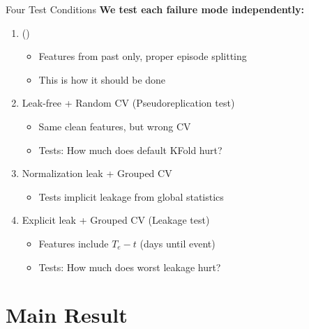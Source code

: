\documentclass[aspectratio=169]{beamer}
\begin{document}
\begin{frame}{Four Test Conditions}
\textbf{We test each failure mode independently:}

\vspace{1em}
\begin{enumerate}
\item {} \hfill ()
\begin{itemize}
\item Features from past only, proper episode splitting
\item This is how it \alert{should} be done
\end{itemize}

\vspace{0.3em}
\item \alert{Leak-free + Random CV} \hfill (\alert{Pseudoreplication test})
\begin{itemize}
\item Same clean features, but wrong CV
\item Tests: How much does default KFold hurt?
\end{itemize}

\vspace{0.3em}
\item Normalization leak + Grouped CV
\begin{itemize}
\item Tests implicit leakage from global statistics
\end{itemize}

\vspace{0.3em}
\item \alert{Explicit leak + Grouped CV} \hfill (\alert{Leakage test})
\begin{itemize}
\item Features include $T_e - t$ (days until event)
\item Tests: How much does worst leakage hurt?
\end{itemize}
\end{enumerate}
\end{frame}

\section{Main Result}
\end{document}

